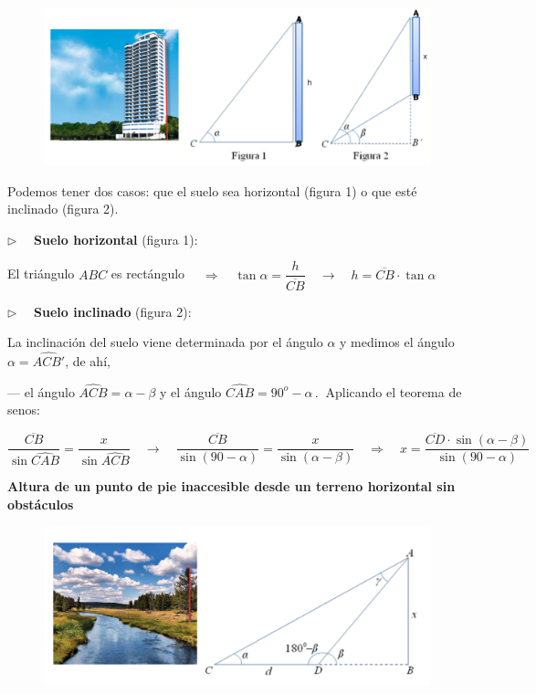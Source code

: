 \begin{figure}[H]
	\centering
	\includegraphics[width=.9\textwidth]{img-triang/topog03.png}
\end{figure}


Podemos tener dos casos: que el suelo sea horizontal (figura 1) o que esté inclinado (figura 2).

\vspace{4mm} $\boldsymbol{\triangleright}\quad$ \textbf{Suelo horizontal} (figura 1):

El triángulo $ABC$ es rectángulo $\quad \Rightarrow \quad \tan \alpha=\dfrac{h}{\overline{CB}} \quad \to \quad h=\overline{CB} \cdot \tan \alpha$



\vspace{4mm}  $\boldsymbol{\triangleright}\quad$ \textbf{Suelo inclinado} (figura 2):

La inclinación del suelo viene determinada por el ángulo $\alpha$ y medimos el ángulo $\alpha=\widehat{ACB'}$, de ahí,

--- el ángulo $\widehat{ACB}=\alpha-\beta$ y el ángulo $\widehat {CAB}=90^o-\alpha\, . \ $ Aplicando el teorema de senos:

 $\dfrac{\overline{CB}}{\sin \widehat {CAB}}=\dfrac{x}{\sin \widehat{ACB}}  \quad \to \quad \dfrac{\overline{CB}}{\sin (90-\alpha)}=\dfrac{x}{\sin (\alpha-\beta)} \quad \Rightarrow \quad  x=\dfrac{\overline{CD} \cdot \sin (\alpha-\beta)}{\sin (90-\alpha)}$

\vspace{8mm}
\begin{large}
\textbf{Altura de un punto de pie inaccesible desde un terreno horizontal sin obstáculos}	
\end{large}

\begin{figure}[H]
	\centering
	\includegraphics[width=.9\textwidth]{img-triang/topog04.png}
\end{figure}

